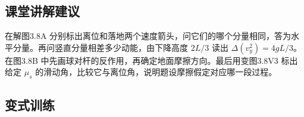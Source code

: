 \documentclass[UTF8,fontset=fandol,a4paper,11pt]{ctexart}
\begin{document}


\subsection*{课堂讲解建议}

在解图3.8A 分别标出离位和落地两个速度箭头，问它们的哪个分量相同，答为水平分量。再问竖直分量相差多少动能，由下降高度 $2L/3$ 读出 $\Delta(v_y^2)=4gL/3$。在图3.8B 中先画球对杆的反作用，再确定地面摩擦方向。最后用变图3.8V3 标出给定 $\mu_s$ 的滑动角，比较它与离位角，说明题设摩擦假定对应哪一段过程。



\subsection*{变式训练}
\end{document}
